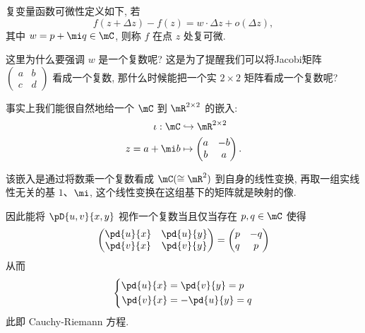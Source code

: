             复变量函数可微性定义如下, 若
            \begin{equation*}\label{C-differential}
                f(z+\Delta z)-f(z) = w\cdot\Delta z+o(\Delta z),
            \end{equation*}
            其中 $w=p+\mi q\in\mC$, 则称 $f$ 在点 $z$ 处复可微.
            
            这里为什么要强调 $w$ 是一个复数呢? 这是为了提醒我们可以将Jacobi矩阵 $
            \begin{pmatrix}
                a & b \\
                c & d
            \end{pmatrix}$ 看成一个复数, 那什么时候能把一个实 $2\times2$ 矩阵看成一个复数呢?

            事实上我们能很自然地给一个 $\mC$ 到 $\mR^{2\times2}$ 的嵌入:
            \begin{equation*}
                \begin{aligned}
                    \iota:\mC &   \hookrightarrow\mR^{2\times2} \\
                    z = a+\mi b &   \mapsto
                    \begin{pmatrix}
                        a & -b \\
                        b & a
                    \end{pmatrix}.
                \end{aligned}
            \end{equation*}
            \begin{remark}
                该嵌入是通过将数乘一个复数看成 $\mC(\cong\mR^2)$ 到自身的线性变换, 再取一组实线性无关的基 $1$、$\mi$, 
                这个线性变换在这组基下的矩阵就是映射的像.
            \end{remark}
            因此能将 $\pD{u,v}{x,y}$ 视作一个复数当且仅当存在 $p,q\in\mC$ 使得
            \begin{equation*}
                \begin{pmatrix} \pd{u}{x} & \pd{u}{y} \\ \pd{v}{x} & \pd{v}{y} \end{pmatrix} = 
                \begin{pmatrix} p & -q \\ q & p \end{pmatrix}
            \end{equation*}
            从而
            \begin{equation*}
                \left\{
                    \begin{aligned}
                        \pd{u}{x} &= \pd{v}{y} = p \\
                        \pd{v}{x} &= -\pd{u}{y} = q
                    \end{aligned}
                \right.
            \end{equation*}
            此即 Cauchy-Riemann 方程.

